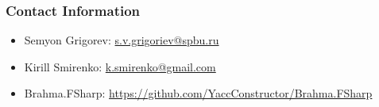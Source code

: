 \documentclass[xcolor=table]{beamer}
\begin{document}
\begin{frame}
\transwipe[direction=90]
\frametitle{Contact Information}
\begin{itemize}
  \item Semyon Grigorev: \href{mailto:s.v.grigoriev@spbu.ru}{s.v.grigoriev@spbu.ru}
  \item Kirill Smirenko: \href{mailto:k.smirenko@gmail.com}{k.smirenko@gmail.com}
\end{itemize}
\begin{itemize}
  \item Brahma.FSharp: \href{https://github.com/YaccConstructor/Brahma.FSharp}{https://github.com/YaccConstructor/Brahma.FSharp}
\end{itemize}
\hspace{2cm}
\end{frame}
\end{document}
